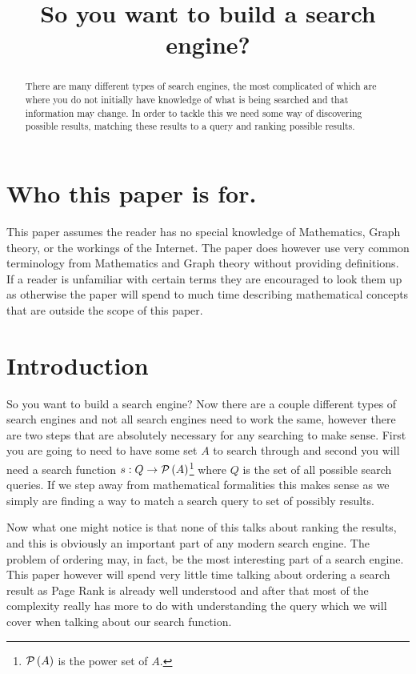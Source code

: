 \documentclass{article}
\title{So you want to build a search engine?}
\begin{document}
	\maketitle
	
	\tableofcontents
	
	\begin{abstract}
		There are many different types of search engines, the most complicated of which are where you do not initially have knowledge of what is being searched and that information may change. In order to tackle this we need some way of discovering possible results, matching these results to a query and ranking possible results. %
	\end{abstract}
	
	\section{Who this paper is for.}
	This paper assumes the reader has no special knowledge of Mathematics, Graph theory, or the workings of the Internet. The paper does however use very common terminology from Mathematics and Graph theory without providing definitions. If a reader is unfamiliar with certain terms they are encouraged to look them up as otherwise the paper will spend to much time describing mathematical concepts that are outside the scope of this paper.
	
	\section{Introduction}
	So you want to build a search engine? Now there are a couple different types of search engines and not all search engines need to work the same, however there are two steps that are absolutely necessary for any searching to make sense. First you are going to need to have some set $A$ to search through and second you will need a search function $s:Q\to\mathcal P\left( {A} \right)$\footnote{$\mathcal P\left( {A} \right)$ is the power set of $A$.} where $Q$ is the set of all possible search queries. If we step away from mathematical formalities this makes sense as we simply are finding a way to match a search query to set of possibly results.
	
	Now what one might notice is that none of this talks about ranking the results, and this is obviously an important part of any modern search engine. The problem of ordering may, in fact, be the most interesting part of a search engine. This paper however will spend very little time talking about ordering a search result as Page Rank is already well understood and after that most of the complexity really has more to do with understanding the query which we will cover when talking about our search function.
	
\end{document}
